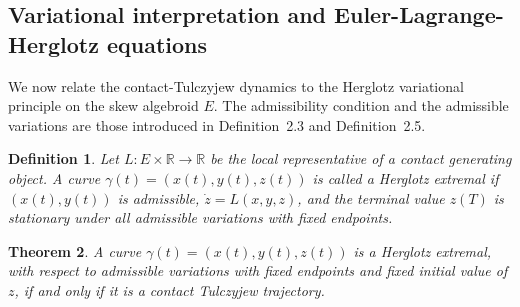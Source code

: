 \documentclass[11pt]{article}
\newtheorem{theorem}{Theorem}[section]
\newtheorem{definition}[theorem]{Definition}
\begin{document}
\subsection{Variational interpretation and Euler-Lagrange-Herglotz equations}
\label{sec:lagrangian}

We now relate the contact-Tulczyjew dynamics to the Herglotz variational
principle on the skew algebroid $E$. The admissibility condition and the
admissible variations are those introduced in Definition~2.3 and
Definition~2.5.

\begin{definition}
Let \(L:E\times\mathbb R\to\mathbb R\) be the local representative of a
contact generating object. A curve $\gamma(t)=(x(t),y(t),z(t))$
is called a Herglotz extremal if \((x(t),y(t))\) is admissible,
$\dot z=L(x,y,z)$, and the terminal value \(z(T)\) is stationary under all admissible
variations with fixed endpoints.
\end{definition}

\begin{theorem}
A curve \(\gamma(t)=(x(t),y(t),z(t))\) is a Herglotz extremal, with respect to
admissible variations with fixed endpoints and fixed initial value of \(z\), if
and only if it is a contact Tulczyjew trajectory.
\end{theorem}
\end{document}

